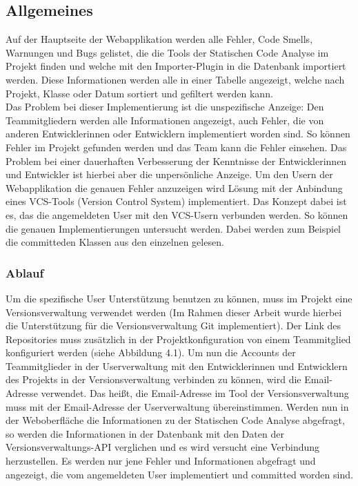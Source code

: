 \subsection{Allgemeines}
Auf der Hauptseite der Webapplikation werden alle Fehler, Code Smells, Warnungen und Bugs gelistet, die die Tools der Statischen Code Analyse im Projekt finden und welche mit den Importer-Plugin in die Datenbank importiert werden. Diese Informationen werden alle in einer Tabelle angezeigt, welche nach Projekt, Klasse oder Datum sortiert und gefiltert werden kann. \\
Das Problem bei dieser Implementierung ist die unspezifische Anzeige: Den Teammitgliedern werden alle Informationen angezeigt, auch Fehler, die von anderen Entwicklerinnen oder Entwicklern implementiert worden sind. So können  Fehler im Projekt gefunden werden und das Team kann die Fehler einsehen. Das Problem bei einer dauerhaften Verbesserung der Kenntnisse der Entwicklerinnen und Entwickler ist hierbei aber die unpersönliche Anzeige. Um den Usern der Webapplikation die genauen Fehler anzuzeigen wird Lösung mit der Anbindung eines VCS-Tools (Version Control System) implementiert. Das Konzept dabei ist es, das die angemeldeten User mit den VCS-Usern verbunden werden. So können die genauen Implementierungen untersucht werden. Dabei werden zum Beispiel die committeden Klassen aus den einzelnen gelesen.
\subsubsection{Ablauf}
Um die spezifische User Unterstützung benutzen zu können, muss im Projekt eine Versionsverwaltung verwendet werden (Im Rahmen dieser Arbeit wurde hierbei die Unterstützung für die Versionsverwaltung Git implementiert). Der Link des Repositories muss zusätzlich in der Projektkonfiguration von einem Teammitglied konfiguriert werden (siehe Abbildung 4.1). Um nun die Accounts der Teammitglieder in der Userverwaltung mit den Entwicklerinnen und Entwicklern des Projekts in der Versionsverwaltung verbinden zu können, wird die Email-Adresse verwendet. Das heißt, die Email-Adresse im Tool der Versionsverwaltung muss mit der Email-Adresse der Userverwaltung übereinstimmen. Werden nun in der Weboberfläche die Informationen zu der Statischen Code Analyse abgefragt, so werden die Informationen in der Datenbank mit den Daten der Versionsverwaltungs-API verglichen und es wird versucht eine Verbindung herzustellen. Es werden nur jene Fehler und Informationen abgefragt und angezeigt, die vom angemeldeten User implementiert und committed worden sind.   
